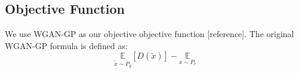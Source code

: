\subsection{Objective Function}
We use WGAN-GP as our objective objective function [reference]. The original WGAN-GP formula is defined as:
\begin{equation}
\underset{\widetilde{x} \sim P_g}{\mathbb{E}}[D(\widetilde{x})] - \underset{x \sim P_r}{\mathbb{E}}
\end{equation}